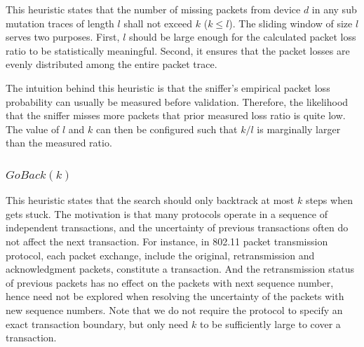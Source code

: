 This heuristic states that the number of missing packets from device $d$ in any
sub mutation traces of length $l$ shall not exceed $k$ ($k \le l$).  The sliding
window of size $l$ serves two purposes. First, $l$ should be large enough for
the calculated packet loss ratio to be statistically meaningful.  Second, it
ensures that the packet losses are evenly distributed among the entire packet
trace.

The intuition behind this heuristic is that the sniffer's empirical packet loss
probability can usually be measured before validation. Therefore, the likelihood
that the sniffer misses more packets that prior measured loss ratio is quite
low. The value of $l$ and $k$ can then be configured such that $k/l$ is marginally
larger than the measured ratio.

\subsubsection{$GoBack(k)$}

This heuristic states that the search should only
backtrack at most $k$ steps when gets stuck.
The motivation is that many protocols operate in a sequence of independent
transactions, and the uncertainty of previous transactions often do not affect
the next transaction.
For instance, in 802.11 packet transmission protocol, each packet exchange,
include the original, retransmission and acknowledgment packets, constitute a
transaction.
And the retransmission status of previous packets has no effect on the packets
with next sequence number, hence need not be explored when resolving the
uncertainty of the packets with new sequence numbers.
Note that we do not require the protocol to specify an exact transaction boundary, but only need $k$ to be sufficiently large to cover a transaction. 


